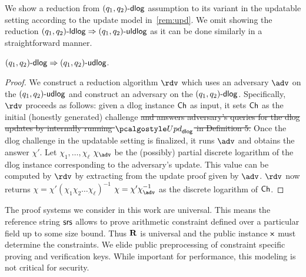 {We show a reduction from $(q_1, q_2)\text{-}\mathsf{dlog}$ assumption to its variant in the updatable setting according to the update model in~\cref{rem:upd}. We omit showing the reduction $(q_1, q_2)\text{-}\mathsf{ldlog} \Rightarrow (q_1, q_2)\text{-}\mathsf{uldlog}$ as it can be done similarly in a straightforward manner.
\begin{lemma}
	$(q_1, q_2)\text{-}\mathsf{dlog} \Rightarrow (q_1, q_2)\text{-}\mathsf{udlog}$.
	\end{lemma}
\begin{proof}
	We construct a reduction algorithm $\reduction$ which uses an adversary $\adv$ on the $(q_1, q_2)\text{-}\mathsf{udlog}$ and construct an adversary on the $(q_1, q_2)\text{-}\mathsf{dlog}$. Specifically, $\reduction$ proceeds as follows: given a dlog instance $\mathsf{Ch}$ as input, it sets $\mathsf{Ch}$ as the initial (honestly generated) challenge \sout{and answers adversary's queries for the dlog updates by internally running $\upd_{\dlog}$ in Definition 5.} Once the dlog challenge in the updatable setting is finalized, it runs $\adv$ and obtains the answer $\chi'$. Let \sout{$\chi_1, \ldots, \chi_\ell$} $\chi_\adv$ be the (possibly) partial discrete logarithm of the dlog instance corresponding to the adversary's update. This value can be computed by $\reduction$ by extracting from the update proof given by $\adv$. $\reduction$ now returns  
	\sout{$\chi = \chi' (\chi_1 \chi_2 \ldots \chi_\ell)^{-1}$} $\chi = \chi' \chi_\adv^{-1}$ as the discrete logarithm of $\mathsf{Ch}$. %
	\end{proof}
}
 The proof systems we consider in this work are universal. This means the reference string $\mathsf{srs}$ allows to prove arithmetic constraint defined over a particular field up to some size bound. Thus $\mathbf{R}$ is universal and the public instance $\mathsf{x}$ must determine the constraints. We elide public preprocessing of constraint specific proving and verification keys. While important for performance, this modeling is not critical for security.




